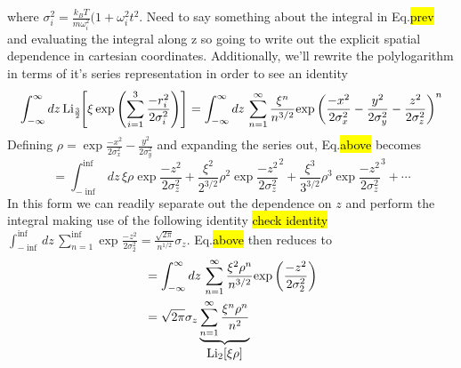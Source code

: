 where $\sigma_i^2 = \frac{k_BT}{m\omega_i^2}(1+\omega_i^2t^2$. Need to say something about the integral in Eq.\hl{prev} and evaluating the integral along z so going to write out the explicit spatial dependence in cartesian coordinates. Additionally, we'll rewrite the polylogarithm in terms of it's series representation in order to see an identity
\begin{equation}
\int_{-\infty}^{\infty} dz\,\text{Li}_{\scriptscriptstyle\frac{3}{2}\!}\!\left[ \xi \,\text{exp}\left( {\sum_{i=1}^3 \frac{-r_i^2}{2\sigma_i^2}} \right) \right] = 
\int_{-\infty}^{\infty} dz\, \sum_{n=1}^{\infty} \frac{\xi^n}{n^{3/2}}\text{exp}\left( {\frac{-x^2}{2\sigma_x^2} - \frac{y^2}{2\sigma_y^2} - \frac{z^2}{2\sigma_z^2}} \right)^n
\end{equation}
Defining $\rho=\exp{\frac{-x^2}{2\sigma_x^2} - \frac{y^2}{2\sigma_y^2}}$ and expanding the series out, Eq.\hl{above} becomes
\begin{equation}
=\int_{-\inf}^{\inf} dz\, \xi\rho\exp{\frac{-z^2}{2\sigma_z^2}} + 
 \frac{\xi^2}{2^{3/2}}\rho^2\exp{\frac{-z^2}{2\sigma_z^2}}^2 + 
 \frac{\xi^3}{3^{3/2}}\rho^3\exp{\frac{-z^2}{2\sigma_z^2}}^3 + \cdots
\end{equation}
In this form we can readily separate out the dependence on $z$ and perform the integral making use of the following identity \hl{check identity} $\displaystyle\int_{-\inf}^{\inf} dz\, \sum_{n=1}^{\inf}\exp{\frac{-z^2}{2\sigma_2^2}} = \frac{\sqrt{2\pi}}{n^{1/2}}\sigma_z$. Eq.\hl{above} then reduces to
\begin{equation}
\begin{split}
&=\int_{-\infty}^{\infty} dz\, \sum_{n=1}^{\infty}\frac{\xi^2\rho^n}{n^{3/2}}\text{exp}\left( {\frac{-z^2}{2\sigma_2^2}} \right) \\
&=\sqrt{2\pi}\sigma_z\underbrace{\sum_{n=1}^{\infty}\frac{\xi^n\rho^n}{n^2}}_{\displaystyle\text{Li}_{2}\!\left[ \xi\rho \right]}
\end{split}
\end{equation}

